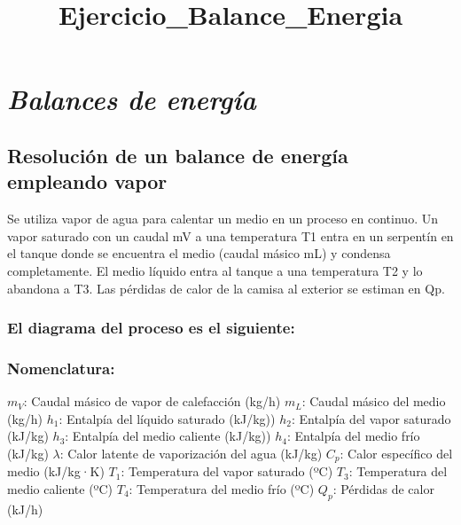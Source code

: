 \documentclass[11pt]{article}
\title{Ejercicio\_Balance\_Energia}
\begin{document}
    
    
    \maketitle
    
    

    
    \hypertarget{balances-de-energuxeda}{%
\section{\texorpdfstring{\emph{Balances de
energía}}{Balances de energía}}\label{balances-de-energuxeda}}

\hypertarget{resoluciuxf3n-de-un-balance-de-energuxeda-empleando-vapor}{%
\subsection{Resolución de un balance de energía empleando
vapor}\label{resoluciuxf3n-de-un-balance-de-energuxeda-empleando-vapor}}

Se utiliza vapor de agua para calentar un medio en un proceso en
continuo. Un vapor saturado con un caudal mV a una temperatura T1 entra
en un serpentín en el tanque donde se encuentra el medio (caudal másico
mL) y condensa completamente. El medio líquido entra al tanque a una
temperatura T2 y lo abandona a T3. Las pérdidas de calor de la camisa al
exterior se estiman en Qp.

\hypertarget{el-diagrama-del-proceso-es-el-siguiente}{%
\subsubsection{El diagrama del proceso es el
siguiente:}\label{el-diagrama-del-proceso-es-el-siguiente}}

\hypertarget{nomenclatura}{%
\subsubsection{Nomenclatura:}\label{nomenclatura}}

\(m_V\): Caudal másico de vapor de calefacción (kg/h) \(m_L\): Caudal
másico del medio (kg/h) \(h_1\): Entalpía del líquido saturado (kJ/kg))
\(h_2\): Entalpía del vapor saturado (kJ/kg) \(h_3\): Entalpía del medio
caliente (kJ/kg)) \(h_4\): Entalpía del medio frío (kJ/kg) \(\lambda\):
Calor latente de vaporización del agua (kJ/kg) \(C_p\): Calor específico
del medio (kJ/kg·K) \(T_1\): Temperatura del vapor saturado (ºC)
\(T_3\): Temperatura del medio caliente (ºC) \(T_4\): Temperatura del
medio frío (ºC) \(Q_p\): Pérdidas de calor (kJ/h)
\end{document}
